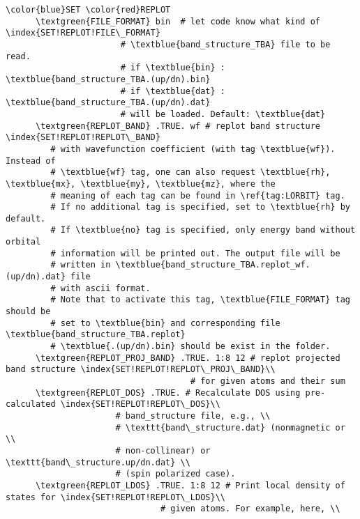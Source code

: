 \documentclass[a4paper,12pt]{scrartcl}
\newcommand{\textblue}[1]{\textcolor{blue!85!white}{\texttt{#1}}}
\newcommand{\textgreen}[1]{\textcolor{green!50!black}{\texttt{#1}}}
\begin{document}
\begin{description}
 \begin{Verbatim}[commandchars=\\\{\},gobble=4, frame=single, framesep=2mm, 
    label= DOS setup example,
    labelposition=bottomline]
    \color{blue}SET \color{red}REPLOT
      \textgreen{FILE_FORMAT} bin  # let code know what kind of \index{SET!REPLOT!FILE\_FORMAT}
                       # \textblue{band_structure_TBA} file to be read.
                       # if \textblue{bin} : \textblue{band_structure_TBA.(up/dn).bin}
                       # if \textblue{dat} : \textblue{band_structure_TBA.(up/dn).dat}
                       # will be loaded. Default: \textblue{dat}
      \textgreen{REPLOT_BAND} .TRUE. wf # replot band structure \index{SET!REPLOT!REPLOT\_BAND}
         # with wavefunction coefficient (with tag \textblue{wf}). Instead of 
         # \textblue{wf} tag, one can also request \textblue{rh}, \textblue{mx}, \textblue{my}, \textblue{mz}, where the 
         # meaning of each tag can be found in \ref{tag:LORBIT} tag.
         # If no additional tag is specified, set to \textblue{rh} by default.
         # If \textblue{no} tag is specified, only energy band without orbital 
         # information will be printed out. The output file will be
         # written in \textblue{band_structure_TBA.replot_wf.(up/dn).dat} file
         # with ascii format.
         # Note that to activate this tag, \textblue{FILE_FORMAT} tag should be 
         # set to \textblue{bin} and corresponding file \textblue{band_structure_TBA.replot}
         # \textblue{.(up/dn).bin} should be exist in the folder.
      \textgreen{REPLOT_PROJ_BAND} .TRUE. 1:8 12 # replot projected band structure \index{SET!REPLOT!REPLOT\_PROJ\_BAND}\\
                                     # for given atoms and their sum
      \textgreen{REPLOT_DOS} .TRUE. # Recalculate DOS using pre-calculated \index{SET!REPLOT!REPLOT\_DOS}\\ 
                      # band_structure file, e.g., \\ 
                      # \texttt{band\_structure.dat} (nonmagnetic or \\
                      # non-collinear) or \texttt{band\_structure.up/dn.dat} \\
                      # (spin polarized case).
      \textgreen{REPLOT_LDOS} .TRUE. 1:8 12 # Print local density of states for \index{SET!REPLOT!REPLOT\_LDOS}\\
                               # given atoms. For example, here, \\

\end{Verbatim}
\end{description}
\end{document}

